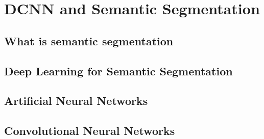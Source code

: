 
\chapter{DCNN and Semantic Segmentation}

\section{What is semantic segmentation}

\section{Deep Learning for Semantic Segmentation}

\section{Artificial Neural Networks}

\section{Convolutional Neural Networks}